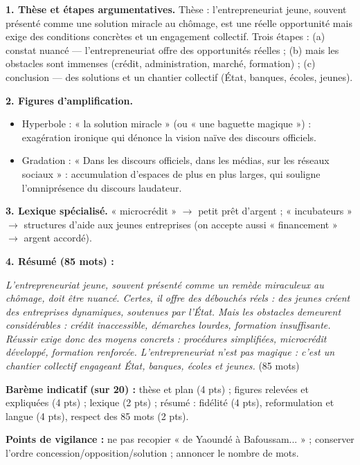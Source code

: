 \documentclass[11pt]{article}
\begin{document}
\begin{exoresolu}
\textbf{1. Thèse et étapes argumentatives.}
Thèse : l'entrepreneuriat jeune, souvent présenté comme une solution miracle au chômage, est une réelle opportunité mais exige des conditions concrètes et un engagement collectif. Trois étapes : (a) constat nuancé — l'entrepreneuriat offre des opportunités réelles ; (b) mais les obstacles sont immenses (crédit, administration, marché, formation) ; (c) conclusion — des solutions et un chantier collectif (État, banques, écoles, jeunes).

\textbf{2. Figures d'amplification.}
\begin{itemize}
\item Hyperbole : « la solution miracle » (ou « une baguette magique ») : exagération ironique qui dénonce la vision naïve des discours officiels.
\item Gradation : « Dans les discours officiels, dans les médias, sur les réseaux sociaux » : accumulation d'espaces de plus en plus larges, qui souligne l'omniprésence du discours laudateur.
\end{itemize}

\textbf{3. Lexique spécialisé.} « microcrédit » $\rightarrow$ petit prêt d'argent ; « incubateurs » $\rightarrow$ structures d'aide aux jeunes entreprises (on accepte aussi « financement » $\rightarrow$ argent accordé).

\textbf{4. Résumé (85 mots) :}

\emph{L'entrepreneuriat jeune, souvent présenté comme un remède miraculeux au chômage, doit être nuancé. Certes, il offre des débouchés réels : des jeunes créent des entreprises dynamiques, soutenues par l'État. Mais les obstacles demeurent considérables : crédit inaccessible, démarches lourdes, formation insuffisante. Réussir exige donc des moyens concrets : procédures simplifiées, microcrédit développé, formation renforcée. L'entrepreneuriat n'est pas magique : c'est un chantier collectif engageant État, banques, écoles et jeunes.} (85 mots)

\textbf{Barème indicatif (sur 20) :} thèse et plan (4 pts) ; figures relevées et expliquées (4 pts) ; lexique (2 pts) ; résumé : fidélité (4 pts), reformulation et langue (4 pts), respect des 85 mots (2 pts).

\textbf{Points de vigilance :} ne pas recopier « de Yaoundé à Bafoussam... » ; conserver l'ordre concession/opposition/solution ; annoncer le nombre de mots.
\end{exoresolu}
\end{document}
